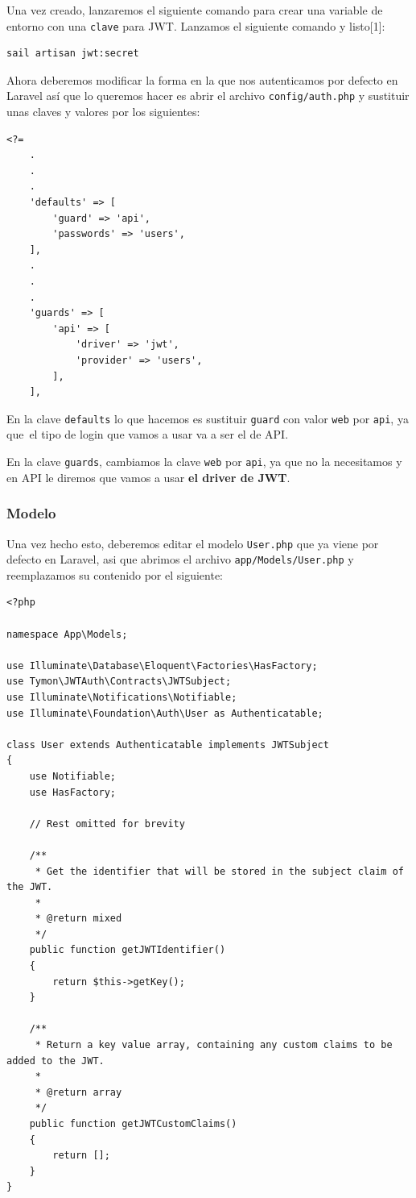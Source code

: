 \documentclass[11pt]{article}
\begin{document}
Una vez creado, lanzaremos el siguiente comando para crear una
variable de entorno con una \texttt{clave} para JWT. Lanzamos el siguiente
comando y listo[1]:
\begin{verbatim}
sail artisan jwt:secret
\end{verbatim}

Ahora deberemos modificar la forma en la que nos autenticamos por
defecto en Laravel así que lo queremos hacer es abrir el archivo
\texttt{config/auth.php} y sustituir unas claves y valores por los siguientes:
\begin{verbatim}
<?=
    .
    .
    .
    'defaults' => [
        'guard' => 'api',
        'passwords' => 'users',
    ],
    .
    .
    .
    'guards' => [
        'api' => [
            'driver' => 'jwt',
            'provider' => 'users',
        ],
    ],
\end{verbatim}

En la clave \texttt{defaults} lo que hacemos es sustituir \texttt{guard} con valor \texttt{web}
por \texttt{api}, ya que el tipo de login que vamos a usar va a ser el de API.

En la clave \texttt{guards}, cambiamos la clave \texttt{web} por \texttt{api}, ya que no la
necesitamos y en API le diremos que vamos a usar \textbf{el driver de JWT}.

\subsubsection{Modelo}
\label{sec:org6f49d19}
Una vez hecho esto, deberemos editar el modelo \texttt{User.php} que ya viene
por defecto en Laravel, asi que abrimos el archivo \texttt{app/Models/User.php}
y reemplazamos su contenido por el siguiente:
\begin{verbatim}
<?php

namespace App\Models;

use Illuminate\Database\Eloquent\Factories\HasFactory;
use Tymon\JWTAuth\Contracts\JWTSubject;
use Illuminate\Notifications\Notifiable;
use Illuminate\Foundation\Auth\User as Authenticatable;

class User extends Authenticatable implements JWTSubject
{
    use Notifiable;
    use HasFactory;

    // Rest omitted for brevity

    /**
     * Get the identifier that will be stored in the subject claim of the JWT.
     *
     * @return mixed
     */
    public function getJWTIdentifier()
    {
        return $this->getKey();
    }

    /**
     * Return a key value array, containing any custom claims to be added to the JWT.
     *
     * @return array
     */
    public function getJWTCustomClaims()
    {
        return [];
    }
}
\end{verbatim}
\end{document}
